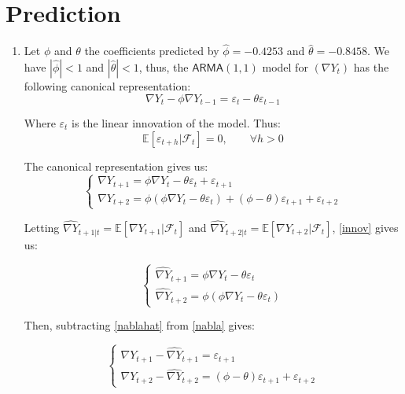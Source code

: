 \documentclass[12pt]{article}
\newcommand{\ARMA}{\textsf{ARMA}}
\begin{document}
    \section{Prediction}

    \begin{enumerate}
        \item Let $\phi$ and $\theta$ the coefficients predicted by $\hat\phi=-0.4253$ and $\hat\theta=-0.8458$. We have $|\hat\phi|<1$ and $|\hat\theta|<1$, thus, the $\ARMA(1,1)$ model for $(\nabla Y_t)$ has the following canonical representation:
        \[\nabla Y_t - \phi \nabla Y_{t-1} = \varepsilon_t - \theta\varepsilon_{t-1}\]

        Where $\varepsilon_t$ is the linear innovation of the model. Thus:
        \begin{equation} \label{innov}
        \mathbb{E}[\varepsilon_{t+h}|\mathcal{F}_t]=0, \qquad \forall h > 0
        \end{equation}

        The canonical representation gives us:
        \begin{equation} \label{nabla}
        \begin{cases}
            \nabla Y_{t+1}=\phi\nabla Y_t - \theta\varepsilon_t + \varepsilon_{t+1} \\
            \nabla Y_{t+2} = \phi(\phi\nabla Y_t -\theta\varepsilon_t) + (\phi - \theta)\varepsilon_{t+1} + \varepsilon_{t+2}
        \end{cases}
        \end{equation}

        Letting $\widehat{\nabla Y}_{t+1|t} = \mathbb{E}[\nabla Y_{t+1}|\mathcal{F}_t]$ and $\widehat{\nabla Y}_{t+2|t} = \mathbb{E}[\nabla Y_{t+2}|\mathcal{F}_t]$, \eqref{innov} gives us:

        \begin{equation} \label{nablahat}
        \begin{cases}
            \widehat{\nabla Y}_{t+1}=\phi\nabla Y_t - \theta\varepsilon_t \\
            \widehat{\nabla Y}_{t+2} = \phi(\phi\nabla Y_t -\theta\varepsilon_t)
        \end{cases}
        \end{equation}

        Then, subtracting \eqref{nablahat} from \eqref{nabla} gives:

        \begin{equation} \label{nablaerr}
        \begin{cases}
            \nabla Y_{t+1} - \widehat{\nabla Y}_{t+1} = \varepsilon_{t+1} \\
            \nabla Y_{t+2} - \widehat{\nabla Y}_{t+2} = (\phi -\theta)\varepsilon_{t+1} + \varepsilon_{t+2}
        \end{cases}
        \end{equation}


\end{enumerate}
\end{document}
